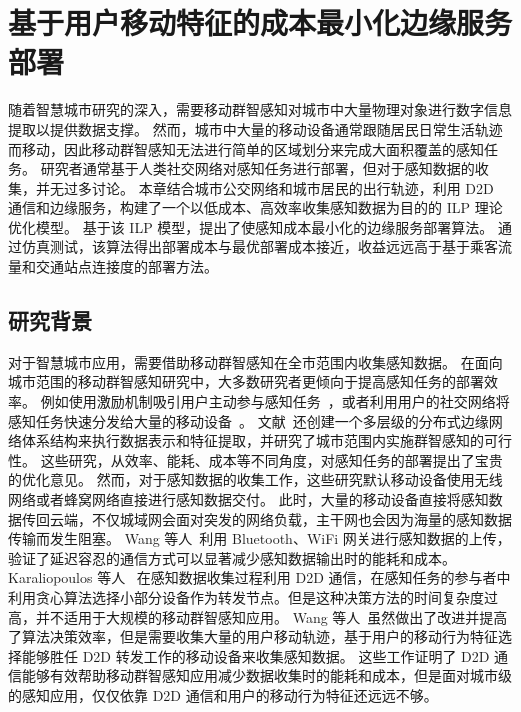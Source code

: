 \chapter{基于用户移动特征的成本最小化边缘服务部署}

随着智慧城市研究的深入，需要移动群智感知对城市中大量物理对象进行数字信息提取以提供数据支撑。
然而，城市中大量的移动设备通常跟随居民日常生活轨迹而移动，因此移动群智感知无法进行简单的区域划分来完成大面积覆盖的感知任务。
研究者通常基于人类社交网络对感知任务进行部署，但对于感知数据的收集，并无过多讨论。
本章结合城市公交网络和城市居民的出行轨迹，利用 D2D 通信和边缘服务，构建了一个以低成本、高效率收集感知数据为目的的 ILP 理论优化模型。
基于该 ILP 模型，提出了使感知成本最小化的边缘服务部署算法。
通过仿真测试，该算法得出部署成本与最优部署成本接近，收益远远高于基于乘客流量和交通站点连接度的部署方法。

\section{研究背景}

对于智慧城市应用，需要借助移动群智感知在全市范围内收集感知数据。
在面向城市范围的移动群智感知研究中，大多数研究者更倾向于提高感知任务的部署效率。
例如使用激励机制吸引用户主动参与感知任务~\cite{CNKI:JiaChaopeng, CNKI:WuMCSIncentive, jiyubianyuanjisuangongyecaiji}，或者利用用户的社交网络将感知任务快速分发给大量的移动设备~\cite{Cnki:Yu2018}。
文献~还创建一个多层级的分布式边缘网络体系结构来执行数据表示和特征提取，并研究了城市范围内实施群智感知的可行性。
这些研究，从效率、能耗、成本等不同角度，对感知任务的部署提出了宝贵的优化意见。
然而，对于感知数据的收集工作，这些研究默认移动设备使用无线网络或者蜂窝网络直接进行感知数据交付。
此时，大量的移动设备直接将感知数据传回云端，不仅城域网会面对突发的网络负载，主干网也会因为海量的感知数据传输而发生阻塞。
Wang 等人~\cite{DBLP:conf/huc/WangZX13}利用 Bluetooth、WiFi 网关进行感知数据的上传，验证了延迟容忍的通信方式可以显著减少感知数据输出时的能耗和成本。
Karaliopoulos 等人~\cite{DBLP:conf/infocom/KaraliopoulosTK15} 在感知数据收集过程利用 D2D 通信，在感知任务的参与者中利用贪心算法选择小部分设备作为转发节点。但是这种决策方法的时间复杂度过高，并不适用于大规模的移动群智感知应用。
Wang 等人~\cite{DBLP:journals/puc/WangLL17}虽然做出了改进并提高了算法决策效率，但是需要收集大量的用户移动轨迹，基于用户的移动行为特征选择能够胜任 D2D 转发工作的移动设备来收集感知数据。
这些工作证明了 D2D 通信能够有效帮助移动群智感知应用减少数据收集时的能耗和成本，但是面对城市级的感知应用，仅仅依靠 D2D 通信和用户的移动行为特征还远远不够。

